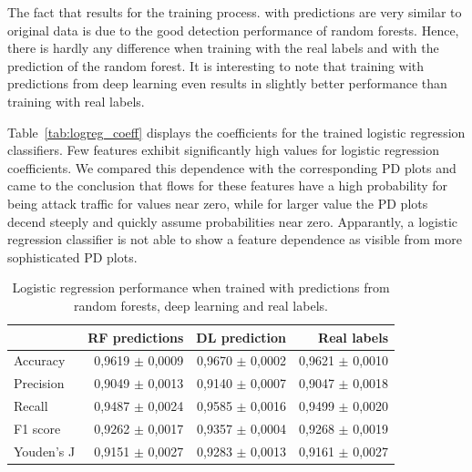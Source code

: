 \documentclass[sigconf,nonacm]{acmart}
\begin{document}
The fact that results for the training process. with predictions are very similar to original data is due to the good detection performance of random forests. Hence, there is hardly any difference when training with the real labels and with the prediction of the random forest. It is interesting to note that training with predictions from deep learning even results in slightly better performance than training with real labels.

 Table~\ref{tab:logreg_coeff} displays the coefficients for the trained logistic regression classifiers.
Few features exhibit significantly high values for logistic regression coefficients. We compared this dependence with the corresponding PD plots and came to the conclusion that flows for these features have a high probability for being attack traffic for values near zero, while  for larger value the PD plots decend steeply and quickly assume probabilities near zero. Apparantly, a logistic regression classifier is not able to show a feature dependence as visible from more sophisticated PD plots.
 
 \begin{table}
 \caption{Logistic regression performance when trained with predictions from random forests, deep learning and real labels.}
 \label{tab:logreg_results}
 \begin{tabular}{l r r r} \toprule
 & RF predictions & DL prediction & Real labels \\ \midrule
 Accuracy	&	0,9619 $\pm$ 0,0009	&	0,9670 $\pm$ 0,0002	&	0,9621 $\pm$ 0,0010	\\
Precision	&	0,9049 $\pm$ 0,0013	&	0,9140 $\pm$ 0,0007	&	0,9047 $\pm$ 0,0018	\\
Recall	&	0,9487 $\pm$ 0,0024	&	0,9585 $\pm$ 0,0016	&	0,9499 $\pm$ 0,0020	\\
F1 score	&	0,9262 $\pm$ 0,0017	&	0,9357 $\pm$ 0,0004	&	0,9268 $\pm$ 0,0019	\\
Youden's J	&	0,9151 $\pm$ 0,0027	&	0,9283 $\pm$ 0,0013	&	0,9161 $\pm$ 0,0027	\\
\bottomrule
\end{tabular}
\end{table}
\end{document}
